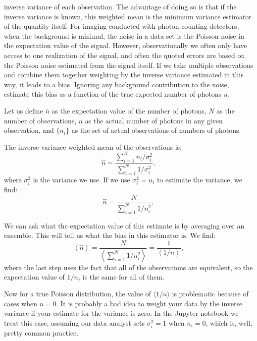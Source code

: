 \begin{enumerate}
inverse variance of each observation. The advantage of doing so is
that if the inverse variance is known, this weighted mean is the
minimum variance estimator of the quantity itself. For imaging
conducted with photon-counting detectors, when the background is
minimal, the noise in a data set is the Poisson noise in
the expectation value of the signal. However, observationally we often
only have access to one realization of the signal, and often the
quoted errors are based on the Poisson noise estimated from the signal
itself. If we take multiple observations and combine them together
weighting by the inverse variance estimated in this way, it leads to a
bias. Ignoring any background contribution to the noise, estimate this
bias as a function of the true expected number of photons $\bar n$.

\begin{answer}
Let us define $\bar n$ as the expectation value of the number of
photons, $N$ as the number of observations, $n$ as the actual number
of photons in any given observation, and $\{n_i\}$ as the set of
actual observations of numbers of photons.

The inverse variance weighted mean of the observations is:
\begin{equation}
{\hat n} = \frac{\sum_{i=1}^N n_i / \sigma_i^2}
{\sum_{i=1}^N 1 / \sigma_i^2},
\end{equation}
where $\sigma_i^2$ is the variance we use. If we use $\sigma_i^2 =
n_i$ to estimate the variance, we find:
\begin{equation}
{\hat n} = \frac{N}{\sum_{i=1}^N 1 / n_i^2},
\end{equation}

We can ask what the expectation value of this estimate is by averaging
over an ensemble. This will tell us what the bias in this estimator
is. We find:
\begin{equation}
\left\langle {\hat n} \right\rangle
= \frac{N}{\left\langle \sum_{i=1}^N 1 / n_i^2 \right\rangle}
= \frac{1}{\left\langle 1/n\right\rangle},
\end{equation}
where the last step uses the fact that all of the observations are
equivalent, so the expectation value of $1/n_i$ is the same for all of
them. 

Now for a true Poisson distribution, the value of $\langle 1/n\rangle$
is problematic because of cases when $n=0$. It is probably a
bad idea to weight your data by the inverse variance if your estimate
for the variance is zero. In the Jupyter notebook we treat this case,
assuming our data analyst sets $\sigma_i^2 = 1$ when $n_i=0$, which
is, well, pretty common practice.


\end{answer}
\end{enumerate}
